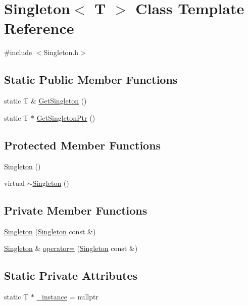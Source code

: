 \section{Singleton$<$ T $>$ Class Template Reference}
\label{class_singleton}


{\ttfamily \#include $<$Singleton.\-h$>$}

\subsection*{Static Public Member Functions}
\begin{DoxyCompactItemize}
\item 
static T \& \hyperlink{class_singleton_a0b9d2412b6b7fce60f7f00881839a090}{Get\-Singleton} ()
\item 
static T $\ast$ \hyperlink{class_singleton_aa0e8519dceaedb3ffc410b7b7cd55368}{Get\-Singleton\-Ptr} ()
\end{DoxyCompactItemize}
\subsection*{Protected Member Functions}
\begin{DoxyCompactItemize}
\item 
\hyperlink{class_singleton_a923b995920da9c06590adb170ab2f890}{Singleton} ()
\item 
virtual \hyperlink{class_singleton_ad3c93143836479fb3dd96b21b795938c}{$\sim$\-Singleton} ()
\end{DoxyCompactItemize}
\subsection*{Private Member Functions}
\begin{DoxyCompactItemize}
\item 
\hyperlink{class_singleton_a073fa3e2d5619c42ee6c8fdb6995e90c}{Singleton} (\hyperlink{class_singleton}{Singleton} const \&)
\item 
\hyperlink{class_singleton}{Singleton} \& \hyperlink{class_singleton_a34272381ecfef4ac7a70d7c40ac9f2a9}{operator=} (\hyperlink{class_singleton}{Singleton} const \&)
\end{DoxyCompactItemize}
\subsection*{Static Private Attributes}
\begin{DoxyCompactItemize}
\item 
static T $\ast$ \hyperlink{class_singleton_a7cae80c9c7ad259cbf60aeff5eefefb6}{\-\_\-instance} = nullptr
\end{DoxyCompactItemize}


